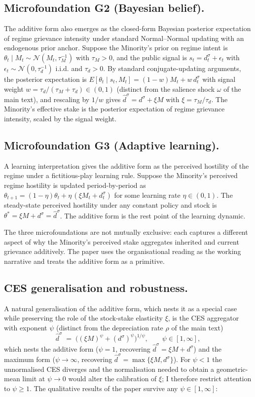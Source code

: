 \documentclass[11pt,twoside]{extarticle}
\begin{document}
\subsection*{Microfoundation G2 (Bayesian belief).} The additive form also emerges as the closed-form Bayesian posterior expectation of regime grievance intensity under standard Normal--Normal updating with an endogenous prior anchor. Suppose the Minority's prior on regime intent is $\theta_t\mid M_t\sim\mathcal N(M_t,\tau_M^{-1})$ with $\tau_M>0$, and the public signal is $s_t=d_t^\sigma+\epsilon_t$ with $\epsilon_t\sim\mathcal N(0,\tau_d^{-1})$ i.i.d. and $\tau_d>0$. By standard conjugate-updating arguments, the posterior expectation is $E[\theta_t\mid s_t,M_t]=(1-w)M_t+w\,d_t^\sigma$ with signal weight $w=\tau_d/(\tau_M+\tau_d)\in(0,1)$ (distinct from the salience shock $\omega$ of the main text), and rescaling by $1/w$ gives $\hat d^\sigma=d^\sigma+\xi M$ with $\xi=\tau_M/\tau_d$. The Minority's effective stake is the posterior expectation of regime grievance intensity, scaled by the signal weight.

\subsection*{Microfoundation G3 (Adaptive learning).} A learning interpretation gives the additive form as the perceived hostility of the regime under a fictitious-play learning rule. Suppose the Minority's perceived regime hostility is updated period-by-period as $\theta_{t+1}=(1-\eta)\theta_t+\eta\,(\xi M_t+d_t^\sigma)$ for some learning rate $\eta\in(0,1)$. The steady-state perceived hostility under any constant policy and stock is $\theta^*=\xi M+d^\sigma=\hat d^\sigma$. The additive form is the rest point of the learning dynamic.

The three microfoundations are not mutually exclusive: each captures a different aspect of why the Minority's perceived stake aggregates inherited and current grievance additively. The paper uses the organisational reading as the working narrative and treats the additive form as a primitive.

\subsection*{CES generalisation and robustness.} A natural generalisation of the additive form, which nests it as a special case while preserving the role of the stock-stake elasticity $\xi$, is the CES aggregator with exponent $\psi$ (distinct from the depreciation rate $\rho$ of the main text)
\begin{equation}\label{eq:CES_oa}
    \hat d^\sigma\;=\;\big((\xi M)^\psi+(d^\sigma)^\psi\big)^{1/\psi},\qquad \psi\in[1,\infty],
\end{equation}
which nests the additive form ($\psi=1$, recovering $\hat d^\sigma=\xi M+d^\sigma$) and the maximum form ($\psi\to\infty$, recovering $\hat d^\sigma=\max\{\xi M,d^\sigma\}$). For $\psi<1$ the unnormalised CES diverges and the normalisation needed to obtain a geometric-mean limit at $\psi\to 0$ would alter the calibration of $\xi$; I therefore restrict attention to $\psi\ge 1$. The qualitative results of the paper survive any $\psi\in[1,\infty]$:
\end{document}
